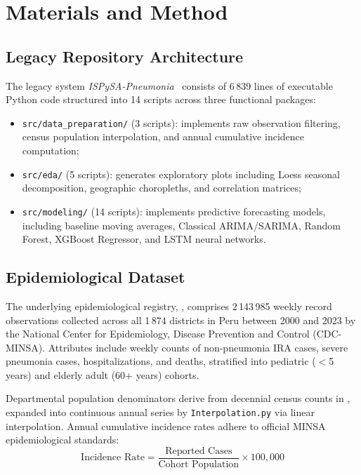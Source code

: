 \documentclass[conference]{IEEEtran}
\begin{document}
\section{Materials and Method}
\label{sec:method}

\subsection{Legacy Repository Architecture}

The legacy system \textit{ISPySA-Pneumonia}~\cite{Danala2024} consists of 6\,839 lines of executable Python code structured into 14 scripts across three functional packages:
\begin{itemize}
  \item \texttt{src/data\_preparation/} (3 scripts): implements raw observation filtering, census population interpolation, and annual cumulative incidence computation;
  \item \texttt{src/eda/} (5 scripts): generates exploratory plots including Loess seasonal decomposition, geographic choropleths, and correlation matrices;
  \item \texttt{src/modeling/} (14 scripts): implements predictive forecasting models, including baseline moving averages, Classical ARIMA/SARIMA, Random Forest, XGBoost Regressor, and LSTM neural networks.
\end{itemize}

\subsection{Epidemiological Dataset}

The underlying epidemiological registry, , comprises 2\,143\,985 weekly record observations collected across all 1\,874 districts in Peru between 2000 and 2023 by the National Center for Epidemiology, Disease Prevention and Control (CDC-MINSA). Attributes include weekly counts of non-pneumonia IRA cases, severe pneumonia cases, hospitalizations, and deaths, stratified into pediatric ($<$5 years) and elderly adult (60+ years) cohorts.

Departmental population denominators derive from decennial census counts in , expanded into continuous annual series by \texttt{Interpolation.py} via linear interpolation. Annual cumulative incidence rates adhere to official MINSA epidemiological standards:
\begin{equation}
\text{Incidence Rate} = \frac{\text{Reported Cases}}{\text{Cohort Population}} \times 100{,}000
\label{eq:incidence}
\end{equation}
\end{document}
